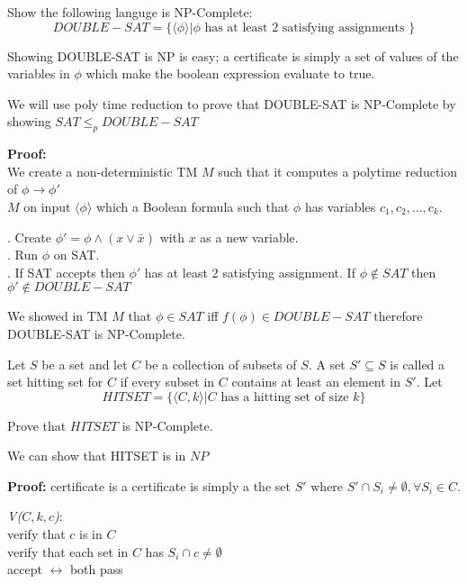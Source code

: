\documentclass[12pt]{exam}
\begin{document}
\begin{questions}
  \question{} %

  Show the following languge is NP-Complete:
  \[DOUBLE-SAT=\{\langle \phi \rangle | \phi \text{ has at least 2 satisfying assignments }\}\]

  \begin{solution}

    Showing DOUBLE-SAT is NP is easy; a certificate is simply a set of values of the variables in $\phi$ which make the boolean expression evaluate to true.

    We will use poly time reduction to prove that DOUBLE-SAT is NP-Complete by showing $SAT \leq_{p} DOUBLE-SAT$


    \textbf{Proof:}\\
    We create a non-deterministic TM $M$ such that it computes a polytime reduction of $\phi \to \phi'$\\
    $M$ on input $\langle \phi \rangle$ which a Boolean formula such that $\phi$ has variables $c_{1}, c_{2}, \dots , c_{k}$.

    \null {}. Create $\phi' = \phi \land (x \lor \bar x)$ with $x$ as a new variable.\\
    \null {}. Run $\phi$ on SAT.\\
    \null {}. If SAT accepts then $\phi'$ has at least 2 satisfying assignment. If $\phi \notin SAT$ then $\phi' \notin DOUBLE-SAT$

    We showed in TM $M$ that $\phi \in SAT$ iff $f(\phi)\in DOUBLE-SAT$ therefore DOUBLE-SAT is NP-Complete.

  \end{solution}

  \question{} %

  Let $S$ be a set and let $C$ be a collection of subsets of $S$. A set $S'\subseteq S$ is called a set hitting set for $C$ if every subset in $C$ contains at least an element in $S'$. Let
  \[HITSET = \{\langle C,k \rangle | C \text{ has a hitting set of size } k\}\]

  Prove that $HITSET$ is NP-Complete.

  \begin{solution}
    We can show that HITSET is in $NP$


    \textbf{Proof:} certificate is a certificate is simply a the set $S'$ where $S' \cap S_{i} \neq \emptyset, \forall S_{i} \in C$.

    \emph{V($C, k, c$)}:\\
    \null \quad verify that $c$ is in $C$\\
    \null \quad verify that each set in $C$ has $S_{i}\cap c \neq \emptyset$\\
    \null \quad accept $\leftrightarrow$ both pass


\end{solution}
\end{questions}
\end{document}
